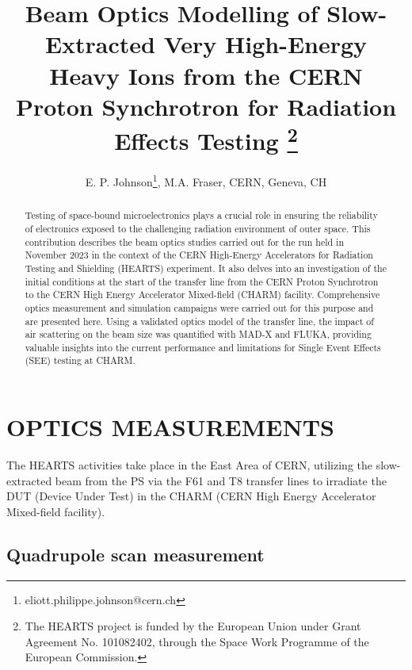 \documentclass[a4paper,
               biblatex,     %
               ]{jacow}
\begin{document}
\title{Beam Optics Modelling of Slow-Extracted Very High-Energy Heavy Ions from the CERN Proton Synchrotron for Radiation Effects Testing \thanks{The HEARTS project is funded by the European Union under Grant Agreement No. 101082402, through the Space Work Programme of the European Commission.}}

\author{E. P. Johnson\thanks{eliott.philippe.johnson@cern.ch}, M.A. Fraser, CERN, Geneva, CH}
	
\maketitle

%
\begin{abstract}
   Testing of space-bound microelectronics plays a crucial role in ensuring the reliability of electronics exposed to the challenging radiation environment of outer space. This contribution describes the beam optics studies carried out for the run held in November 2023 in the context of the CERN High-Energy Accelerators for Radiation Testing and Shielding (HEARTS) experiment. It also delves into an investigation of the initial conditions at the start of the transfer line from the CERN Proton Synchrotron to the CERN High Energy Accelerator Mixed-field (CHARM) facility. Comprehensive optics measurement and simulation campaigns were carried out for this purpose and are presented here. Using a validated optics model of the transfer line, the impact of air scattering on the beam size was quantified with MAD-X and FLUKA, providing valuable insights into the current performance and limitations for Single Event Effects (SEE) testing at CHARM.
\end{abstract}



\section{OPTICS MEASUREMENTS}

The HEARTS activities take place in the East Area of CERN, utilizing the slow-extracted beam from the PS via the F61 and T8 transfer lines to irradiate the DUT (Device Under Test) in the CHARM (CERN High Energy Accelerator Mixed-field facility).

\subsection{Quadrupole scan measurement}
\end{document}
